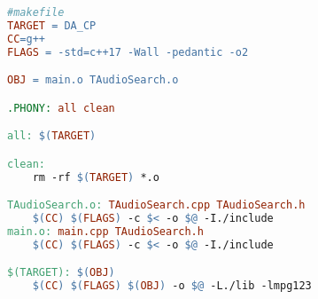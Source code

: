 \begin{lstlisting}[language=make]
#makefile
TARGET = DA_CP
CC=g++
FLAGS = -std=c++17 -Wall -pedantic -o2

OBJ = main.o TAudioSearch.o

.PHONY: all clean

all: $(TARGET)

clean:
	rm -rf $(TARGET) *.o

TAudioSearch.o: TAudioSearch.cpp TAudioSearch.h
	$(CC) $(FLAGS) -c $< -o $@ -I./include
main.o: main.cpp TAudioSearch.h
	$(CC) $(FLAGS) -c $< -o $@ -I./include

$(TARGET): $(OBJ)
	$(CC) $(FLAGS) $(OBJ) -o $@ -L./lib -lmpg123


\end{lstlisting}
\pagebreak